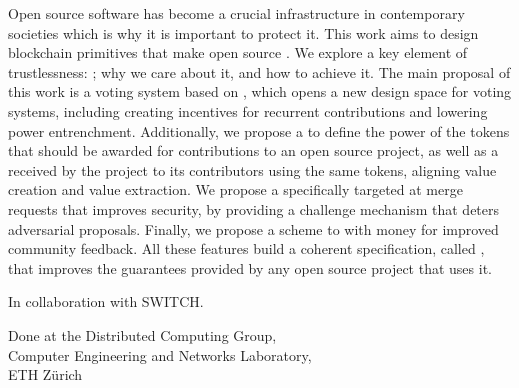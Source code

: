   Open source software has become a crucial infrastructure in contemporary societies which is why it is important to protect it.
  This work aims to design blockchain primitives that make open source .
  We explore a key element of trustlessness: ; why we care about it, and how to achieve it.
  The main proposal of this work is a voting system based on , which opens a new design space for voting systems, including creating incentives for recurrent contributions and lowering power entrenchment.
  Additionally, we propose a  to define the power of the tokens that should be awarded for contributions to an open source project, as well as a  received by the project to its contributors using the same tokens, aligning value creation and value extraction.
  We propose a  specifically targeted at merge requests that improves security, by providing a challenge mechanism that deters adversarial proposals.
  Finally, we propose a scheme to  with money for improved community feedback.
  All these features build a coherent specification, called , that improves the guarantees provided by any open source project that uses it.
\endgroup%

\vfill%

%
In collaboration with SWITCH.

\vspace*{1cm}
%
Done at the Distributed Computing Group,\\[2pt]
Computer Engineering and Networks Laboratory,\\[2pt]
ETH Zürich

